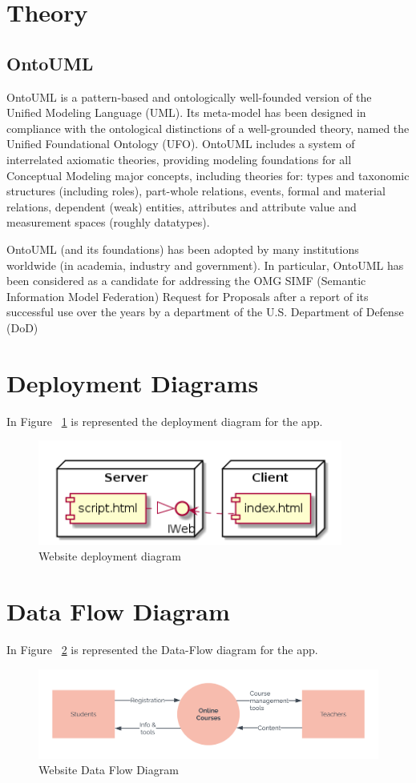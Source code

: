 \documentclass[12pt,a4paper,titlepage]{article}
\begin{document}
\section{Theory}

\subsection{OntoUML}
OntoUML is a pattern-based and ontologically well-founded version of the Unified Modeling Language (UML). Its meta-model has been designed in compliance with the ontological distinctions of a well-grounded theory, named the Unified Foundational Ontology (UFO). OntoUML includes a system of interrelated axiomatic theories, providing modeling foundations for all Conceptual Modeling major concepts, including theories for: types and taxonomic structures (including roles), part-whole relations, events, formal and material relations, dependent (weak) entities, attributes and attribute value and measurement spaces (roughly datatypes). \par

OntoUML (and its foundations) has been adopted by many institutions worldwide (in academia, industry and government). In particular, OntoUML has been considered as a candidate for addressing the OMG SIMF (Semantic Information Model Federation) Request for Proposals after a report of its successful use over the years by a department of the U.S. Department of Defense (DoD)\par
\clearpage

\section{Deployment Diagrams}
In Figure ~\ref{fig:deploy} is represented the deployment diagram for the app.
\begin{figure}[H]
\centering
	\includegraphics[width=10cm]{deploy}
	\caption{Website deployment diagram}
	\label{fig:deploy}
\end{figure}

\section{Data Flow Diagram}
In Figure ~\ref{fig:data} is represented the Data-Flow diagram for the app.
\begin{figure}[H]
\centering
	\includegraphics[width=15cm]{data}
	\caption{Website Data Flow Diagram}
	\label{fig:data}
\end{figure}
\end{document}
